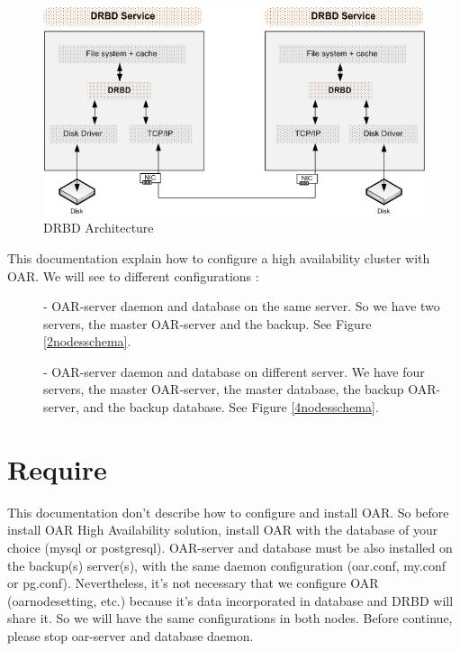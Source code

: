\documentclass[a4paper,10pt]{report}
\begin{document}
\begin{figure}
\begin{center}
\includegraphics[scale=0.5]{schema/DRBD.png}
\end{center}
\caption{DRBD Architecture} 
\label{drbd} 
\end{figure} 



This documentation explain how to configure a high availability cluster with OAR. We will see to different configurations :
\begin{description}
\item[]- OAR-server daemon and database on the same server. So we have two servers, the master OAR-server and the backup. See Figure \ref{2nodesschema}.


\item[]- OAR-server daemon and database on different server. We have four servers, the master OAR-server, the master database, the backup OAR-server, and the backup database.
See Figure \ref{4nodesschema}.

\end{description}


\section{Require}
This documentation don't describe how to configure and install OAR. So before install OAR High Availability solution, 
install OAR with the database of your choice (mysql or postgresql). OAR-server and database must be also installed on the backup(s) server(s), 
with the same daemon configuration (oar.conf, my.conf or pg.conf). 
Nevertheless, it's not necessary that we configure OAR (oarnodesetting, etc.) because it's data incorporated in database and DRBD will share it. So we will have the same configurations in both nodes.
Before continue, please stop oar-server and database daemon.
\end{document}
